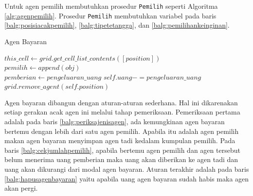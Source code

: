 Untuk agen pemilih membutuhkan prosedur \texttt{Pemilih} seperti Algoritma \ref{alg:agenpemilih}. Prosedur \texttt{Pemilih} membutuhkan variabel pada baris \ref{balg:posisiacakpemilih}, \ref{balg:tipetetangga}, dan \ref{balg:pemilihankeinginan}.

\begin{algorithm}[H]
	\caption{Agen Bayaran}\label{alg:agenbayaran}
	\begin{algorithmic}[1]
			\State $this\_cell \gets grid.get\_cell\_list\_contents([position])$
			\\
				\label{balg:periksajenisagen}
					\State $pemilih \gets append(obj)$
				\EndIf
				\\
				\label{balg:cekjumlahpemilih}
					\State $pemberian \gets pengeluaran\_uang$
					\State $self.uang -= pengeluaran\_uang$
				\EndIf
				\\
				\label{balg:hapusagenbayaran}
					\State $grid.remove\_agent(self.position)$
				\EndIf
			\EndWhile
		\EndProcedure
	\end{algorithmic}
\end{algorithm}

Agen bayaran dibangun dengan aturan-aturan sederhana. Hal ini dikarenakan setiap gerakan acak agen ini melalui tahap pemeriksaan. Pemeriksaan pertama adalah pada baris \ref{balg:periksajenisagen}, ada kemungkinan agen bayaran bertemu dengan lebih dari satu agen pemilih. Apabila itu adalah agen pemilih makan agen bayaran menyimpan agen tadi kedalam kumpulan pemilih. Pada baris \ref{balg:cekjumlahpemilih}, apabila bertemu agen pemilih dan agen tersebut belum menerima uang pemberian maka uang akan diberikan ke agen tadi dan uang akan dikurangi dari modal agen bayaran. Aturan terakhir adalah pada baris \ref{balg:hapusagenbayaran} yaitu apabila uang agen bayaran sudah habis maka agen akan pergi.

